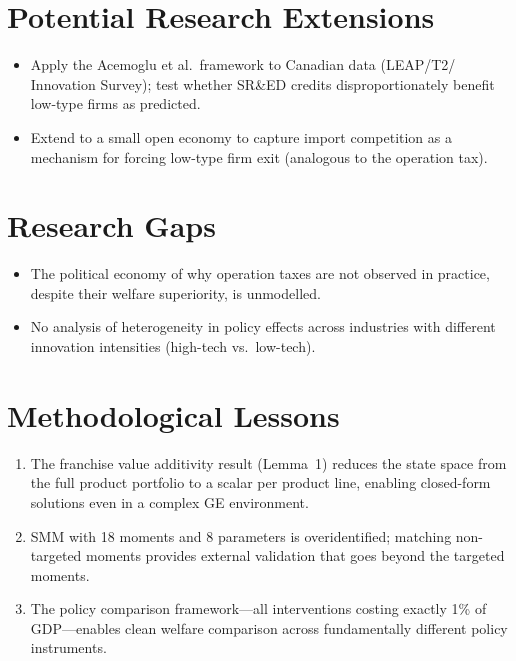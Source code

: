 \section{Potential Research Extensions}

\begin{itemize}
  \item Apply the Acemoglu et al.\ framework to Canadian data (LEAP/T2/
    Innovation Survey); test whether SR\&ED credits disproportionately
    benefit low-type firms as predicted.
  \item Extend to a small open economy to capture import competition as a
    mechanism for forcing low-type firm exit (analogous to the operation tax).
\end{itemize}

\section{Research Gaps}

\begin{itemize}
  \item The political economy of why operation taxes are not observed in
    practice, despite their welfare superiority, is unmodelled.
  \item No analysis of heterogeneity in policy effects across industries
    with different innovation intensities (high-tech vs.\ low-tech).
\end{itemize}

\section{Methodological Lessons}

\begin{enumerate}
  \item The franchise value additivity result (Lemma~1) reduces the state
    space from the full product portfolio to a scalar per product line,
    enabling closed-form solutions even in a complex GE environment.
  \item SMM with 18 moments and 8 parameters is overidentified; matching
    non-targeted moments provides external validation that goes beyond the
    targeted moments.
  \item The policy comparison framework---all interventions costing exactly
    1\% of GDP---enables clean welfare comparison across fundamentally
    different policy instruments.
\end{enumerate}

